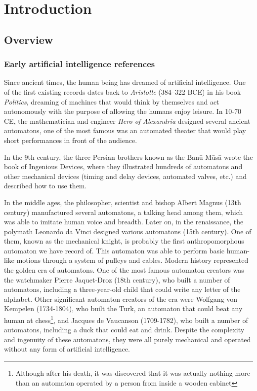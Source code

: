 \chapter{Introduction} \label{ch:introduction}
\section{Overview}
\subsection{Early artificial intelligence references}
Since ancient times, the human being has dreamed of artificial intelligence. One of the first existing records dates back to \textit{Aristotle} (384–322 BCE) in his book \textit{Politics}, dreaming of machines that would think by themselves and act autonomously with the purpose of allowing the humans enjoy leisure. In 10-70 CE, the mathematician and engineer \textit{Hero of Alexandria} designed several ancient automatons, one of the most famous was an automated theater that would play short performances in front of the audience. 

In the 9th century, the three Persian brothers known as the Banū Mūsā wrote the book of Ingenious Devices, where they illustrated hundreds of automatons and other mechanical devices (timing and delay devices, automated valves, etc.) and described how to use them. 

In the middle ages, the philosopher, scientist and bishop Albert Magnus (13th century) manufactured several automatons, a talking head among them, which was able to imitate human voice and breadth. Later on, in the renaissance, the polymath Leonardo da Vinci designed various automatons (15th century). One of them, known as the mechanical knight, is probably the first anthropomorphous automaton we have record of. This automaton was able to perform basic human-like motions through a system of pulleys and cables. Modern history represented the golden era of automatons. One of the most famous automaton creators was the watchmaker Pierre Jaquet-Droz (18th century), who built a number of automatons, including a three-year-old child that could write any letter of the alphabet. Other significant automaton creators of the era were Wolfgang von Kempelen (1734-1804), who built the Turk, an automaton that could beat any human at chess\footnote{Although after his death, it was discovered that it was actually nothing more than an automaton operated by a person from inside a wooden cabinet }, and Jacques de Vaucanson (1709-1782), who built a number of automatons, including a duck that could eat and drink. Despite the complexity and ingenuity of these automatons, they were all purely mechanical and operated without any form of artificial intelligence.

